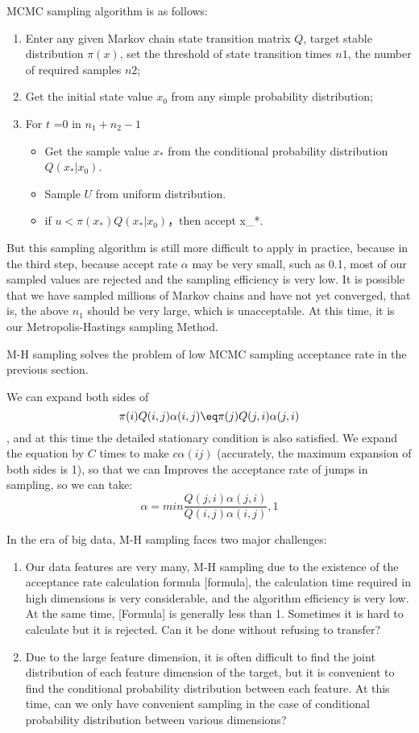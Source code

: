 MCMC sampling algorithm is as follows:
\begin{enumerate}
  \item Enter any given Markov chain state transition matrix $Q$, target stable distribution $\pi(x)$, set the threshold of state transition times $n1$, the number of required samples $n2$;
  \item Get the initial state value $x_0$ from any simple probability distribution;
  \item For $t$ =0 in $n_1+n_2-1$
    \begin{itemize}
      \item Get the sample value $x_*$ from the conditional probability distribution $Q(x_*|x_0)$.
      \item Sample $U$ from uniform distribution.
      \item if $u<\pi(x_*)Q(x_*|x_0)$，then accept x_*.
    \end{itemize}
\end{enumerate}


But this sampling algorithm is still more difficult to apply in practice, because in the third step, because accept rate $\alpha$ may be very small, such as 0.1, most of our sampled values ​​are rejected and the sampling efficiency is very low. It is possible that we have sampled millions of Markov chains and have not yet converged, that is, the above $n_1$ should be  very large, which is unacceptable. At this time, it is our Metropolis-Hastings sampling Method.

M-H sampling solves the problem of low MCMC sampling acceptance rate in the previous section.

We can expand both sides of \[
  \pi(i)Q(i,j)\alpha(i,j) \eq \pi(j)Q(j,i)\alpha(j,i)
\], and at this time the detailed stationary condition is also satisfied. We expand the equation by $C$ times to make $c\alpha(ij)$ (accurately, the maximum expansion of both sides is 1), so that we can Improves the acceptance rate of jumps in sampling, so we can take:
\[
  \alpha = min{\frac{Q(j,i)\alpha(j,i)}{Q(i,j)\alpha(i,j)},1}
\]

In the era of big data, M-H sampling faces two major challenges:
\begin{enumerate}
  \item Our data features are very many, M-H sampling due to the existence of the acceptance rate calculation formula [formula], the calculation time required in high dimensions is very considerable, and the algorithm efficiency is very low. At the same time, [Formula] is generally less than 1. Sometimes it is hard to calculate but it is rejected. Can it be done without refusing to transfer?
  \item Due to the large feature dimension, it is often difficult to find the joint distribution of each feature dimension of the target, but it is convenient to find the conditional probability distribution between each feature. At this time, can we only have convenient sampling in the case of conditional probability distribution between various dimensions?
\end{enumerate}

